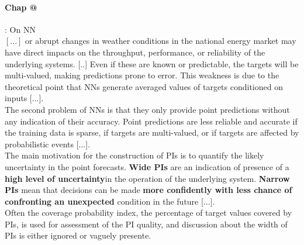 \documentclass[a4paper,12pt]{article}
\makeatletter
\newcommand\bk{\color{black}}
\newcommand\navy{\color{navy}}
\newcommand{\dgreen}{\color{dgreen}}
\newcommand\red{\color{red}}
\numberwithin{equation}{section} %
\newcommand*{\rom}[1]{\expandafter\@slowromancap\romannumeral #1@}
\makeatother
\begin{document}
\paragraph*{Chap \rom{1}} : On NN \\ 
$[...]$ or abrupt changes in weather conditions in the national energy market may have direct impacts on the throughput, performance, or reliability of the underlying systems. 
[..] Even if these are known or predictable, the targets will be multi-valued, making predictions prone to error. This weakness is due to the theoretical point that NNs generate averaged values of targets conditioned on inputs [...]. \\
The second problem of NNs is that they only provide point predictions without any indication of their accuracy. Point predictions are less reliable and accurate if the training data is sparse,  if targets are multi-valued, or if targets are affected by probabilistic events [...]. \\
The main motivation for the construction of \red PIs \bk is to quantify the likely uncertainty in the point forecasts. \navy \textbf{Wide PIs} \bk are an indication of presence of a \navy \textbf{high level of uncertainty}\bk in the operation of the underlying system. \dgreen \textbf{Narrow PIs} \bk mean that decisions can be made \dgreen \textbf{more confidently with less chance of confronting an unexpected} \bk  condition in the future [...].\\
Often the coverage probability index, the percentage of target values covered by PIs, is used for assessment of the PI quality, and discussion about the width of PIs is either ignored or vaguely presente.
\newpage 



\end{document}
